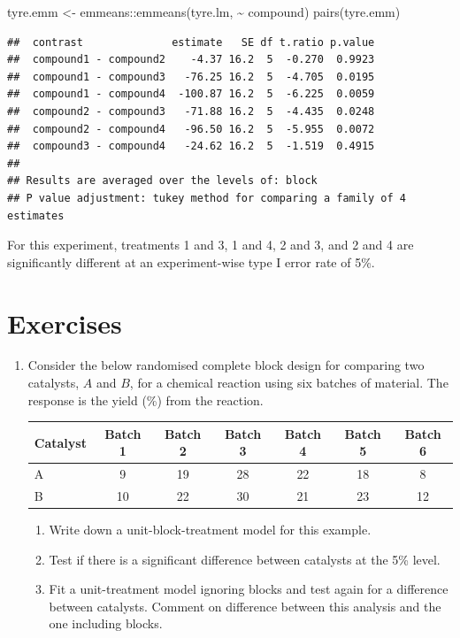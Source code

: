 \documentclass[
]{book}
\newenvironment{Shaded}{\begin{snugshade}}{\end{snugshade}}
\newcommand{\FunctionTok}[1]{\textcolor[rgb]{0.00,0.00,0.00}{#1}}
\newcommand{\NormalTok}[1]{#1}
\newcommand{\OtherTok}[1]{\textcolor[rgb]{0.56,0.35,0.01}{#1}}
\newcommand{\SpecialCharTok}[1]{\textcolor[rgb]{0.00,0.00,0.00}{#1}}
\providecommand{\tightlist}{%
  \setlength{\itemsep}{0pt}\setlength{\parskip}{0pt}}
\theoremstyle{definition}
\theoremstyle{definition}
\theoremstyle{definition}
\theoremstyle{definition}
\theoremstyle{remark}
\begin{document}
\begin{Shaded}
\begin{Highlighting}[]
\NormalTok{tyre.emm }\OtherTok{\textless{}{-}}\NormalTok{ emmeans}\SpecialCharTok{::}\FunctionTok{emmeans}\NormalTok{(tyre.lm, }\SpecialCharTok{\textasciitilde{}}\NormalTok{ compound)}
\FunctionTok{pairs}\NormalTok{(tyre.emm)}
\end{Highlighting}
\end{Shaded}

\begin{verbatim}
##  contrast              estimate   SE df t.ratio p.value
##  compound1 - compound2    -4.37 16.2  5  -0.270  0.9923
##  compound1 - compound3   -76.25 16.2  5  -4.705  0.0195
##  compound1 - compound4  -100.87 16.2  5  -6.225  0.0059
##  compound2 - compound3   -71.88 16.2  5  -4.435  0.0248
##  compound2 - compound4   -96.50 16.2  5  -5.955  0.0072
##  compound3 - compound4   -24.62 16.2  5  -1.519  0.4915
## 
## Results are averaged over the levels of: block 
## P value adjustment: tukey method for comparing a family of 4 estimates
\end{verbatim}

For this experiment, treatments 1 and 3, 1 and 4, 2 and 3, and 2 and 4 are significantly different at an experiment-wise type I error rate of 5\%.

\hypertarget{exercises-1}{%
\section{Exercises}\label{exercises-1}}

\begin{enumerate}
\def\labelenumi{\arabic{enumi}.}
\item
  Consider the below randomised complete block design for comparing two catalysts, \(A\) and \(B\), for a chemical reaction using six batches of material. The response is the yield (\%) from the reaction.

  \begin{longtable}[]{@{}lcccccc@{}}
  \toprule()
  Catalyst & Batch 1 & Batch 2 & Batch 3 & Batch 4 & Batch 5 & Batch 6 \\
  \midrule()
  \endhead
  A & 9 & 19 & 28 & 22 & 18 & 8 \\
  B & 10 & 22 & 30 & 21 & 23 & 12 \\
  \bottomrule()
  \end{longtable}

  \begin{enumerate}
  \def\labelenumii{\roman{enumii}.}
  \tightlist
  \item
    Write down a unit-block-treatment model for this example.
  \item
    Test if there is a significant difference between catalysts at the 5\% level.
  \item
    Fit a unit-treatment model ignoring blocks and test again for a difference between catalysts. Comment on difference between this analysis and the one including blocks.
  \end{enumerate}
\end{enumerate}
\end{document}

